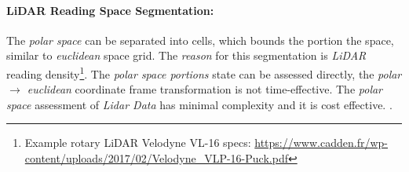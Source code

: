 \paragraph{LiDAR Reading Space Segmentation:} The \emph{polar space} can be separated into cells, which bounds the portion the space, similar to \emph{euclidean} space grid. The \emph{reason} for this segmentation is \emph{LiDAR} reading density\footnote{Example rotary LiDAR Velodyne VL-16 specs: \url{https://www.cadden.fr/wp-content/uploads/2017/02/Velodyne_VLP-16-Puck.pdf}}. The \emph{polar space portions} state can be assessed directly, the \emph{polar $\to$ euclidean} coordinate frame transformation is not time-effective. The \emph{polar space} assessment of \emph{Lidar Data} has minimal complexity and it is cost effective. \cite{gupta2010comparative}.

